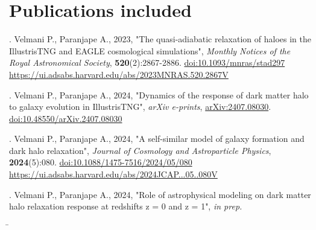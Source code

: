 \documentclass[a4paper, 12pt, oneside]{Thesis}  %
\newcommand{\doi}[1]{\href{https://doi.org/#1}{doi:#1}}
\begin{document}
\section*{Publications included}

. Velmani P., Paranjape A., 2023, "The quasi-adiabatic relaxation of haloes in the IllustrisTNG and EAGLE cosmological simulations", \textit{Monthly Notices of the Royal Astronomical Society}, 
\textbf{520}(2):2867-2886. 
\doi{10.1093/mnras/stad297}
\href{https://ui.adsabs.harvard.edu/abs/2023MNRAS.520.2867V}{https://ui.adsabs.harvard.edu/abs/2023MNRAS.520.2867V}

\vspace{0.5cm}

. Velmani P., Paranjape A., 2024, "Dynamics of the response of dark matter halo to galaxy evolution in IllustrisTNG", \textit{arXiv e-prints}, 
\href{https://ui.adsabs.harvard.edu/abs/2024arXiv240708030V}{arXiv:2407.08030}. 
\doi{10.48550/arXiv.2407.08030}

\vspace{0.5cm}

. Velmani P., Paranjape A., 2024, "A self-similar model of galaxy formation and dark halo relaxation", \textit{Journal of Cosmology and Astroparticle Physics}, 
\textbf{2024}(5):080. 
\doi{10.1088/1475-7516/2024/05/080}
\href{https://ui.adsabs.harvard.edu/abs/2024JCAP...05..080V}{https://ui.adsabs.harvard.edu/abs/2024JCAP...05..080V}

\vspace{0.5cm}

. Velmani P., Paranjape A., 2024, "Role of astrophysical modeling on dark matter halo relaxation response at redshifts z = 0 and z = 1", \textit{in prep.}








\vfill


\begin{tabbing}
    \hspace{\textwidth-6cm} \= \hspace{6cm} \kill
    \underline{\hspace{5cm}} \> \underline{\hspace{5cm}} \\
     \>  \\
     \> 
\end{tabbing}
\end{document}
